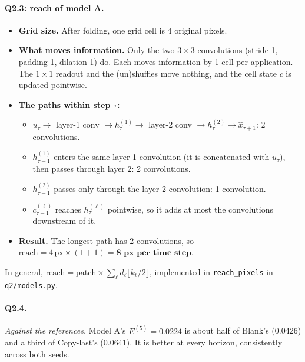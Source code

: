 \documentclass[11pt,a4paper]{article}
\begin{document}
\paragraph{Q2.3: reach of model A.}
\begin{itemize}
  \item \textbf{Grid size.} After folding, one grid cell is 4 original pixels.
  \item \textbf{What moves information.} Only the two $3\times3$ convolutions
        (stride 1, padding 1, dilation 1) do. Each moves information by 1 cell
        per application. The $1\times1$ readout and the (un)shuffles move
        nothing, and the cell state $c$ is updated pointwise.
  \item \textbf{The paths within step $\tau$:}
  \begin{itemize}
    \item $u_\tau\to$ layer-1 conv $\to h^{(1)}_\tau\to$ layer-2 conv
          $\to h^{(2)}_\tau\to\hat x_{\tau+1}$: 2 convolutions.
    \item $h^{(1)}_{\tau-1}$ enters the same layer-1 convolution (it is
          concatenated with $u_\tau$), then passes through layer 2: 2
          convolutions.
    \item $h^{(2)}_{\tau-1}$ passes only through the layer-2 convolution:
          1 convolution.
    \item $c^{(\ell)}_{\tau-1}$ reaches $h^{(\ell)}_\tau$ pointwise, so it adds
          at most the convolutions downstream of it.
  \end{itemize}
  \item \textbf{Result.} The longest path has 2 convolutions, so
        $\text{reach}=4\,\text{px}\times(1+1)=\textbf{8 px per time step}$.
\end{itemize}
In general, $\text{reach}=\text{patch}\times\sum_\ell d_\ell\lfloor k_\ell/2\rfloor$,
implemented in \texttt{reach\_pixels} in \texttt{q2/models.py}.

\paragraph{Q2.4.} \emph{Against the references.} Model A's $E^{(5)}=0.0224$ is
about half of Blank's (0.0426) and a third of Copy-last's (0.0641). It is better
at every horizon, consistently across both seeds.
\end{document}
